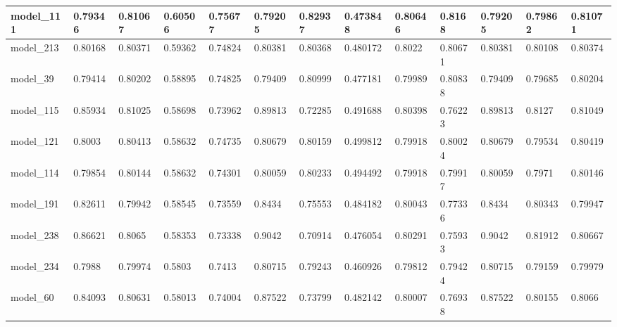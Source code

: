 \begin{tabular}{|l|l|l|l|l|l|l|l|l|l|l|l|l|}
model\_111     & 0.79346     & 0.81067        & 0.60506      & 0.75677          & 0.79205              & 0.82937              & 0.473848     & 0.80646           & 0.8168             & 0.79205         & 0.79862     & 0.81071      \\ \hline
model\_213     & 0.80168     & 0.80371        & 0.59362      & 0.74824          & 0.80381              & 0.80368              & 0.480172     & 0.8022            & 0.80671            & 0.80381         & 0.80108     & 0.80374      \\ \hline
model\_39      & 0.79414     & 0.80202        & 0.58895      & 0.74825          & 0.79409              & 0.80999              & 0.477181     & 0.79989           & 0.80838            & 0.79409         & 0.79685     & 0.80204      \\ \hline
model\_115     & 0.85934     & 0.81025        & 0.58698      & 0.73962          & 0.89813              & 0.72285              & 0.491688     & 0.80398           & 0.76223            & 0.89813         & 0.8127      & 0.81049      \\ \hline
model\_121     & 0.8003      & 0.80413        & 0.58632      & 0.74735          & 0.80679              & 0.80159              & 0.499812     & 0.79918           & 0.80024            & 0.80679         & 0.79534     & 0.80419      \\ \hline
model\_114     & 0.79854     & 0.80144        & 0.58632      & 0.74301          & 0.80059              & 0.80233              & 0.494492     & 0.79918           & 0.79917            & 0.80059         & 0.7971      & 0.80146      \\ \hline
model\_191     & 0.82611     & 0.79942        & 0.58545      & 0.73559          & 0.8434               & 0.75553              & 0.484182     & 0.80043           & 0.77336            & 0.8434          & 0.80343     & 0.79947      \\ \hline
model\_238     & 0.86621     & 0.8065         & 0.58353      & 0.73338          & 0.9042               & 0.70914              & 0.476054     & 0.80291           & 0.75933            & 0.9042          & 0.81912     & 0.80667      \\ \hline
model\_234     & 0.7988      & 0.79974        & 0.5803       & 0.7413           & 0.80715              & 0.79243              & 0.460926     & 0.79812           & 0.79424            & 0.80715         & 0.79159     & 0.79979      \\ \hline
model\_60      & 0.84093     & 0.80631        & 0.58013      & 0.74004          & 0.87522              & 0.73799              & 0.482142     & 0.80007           & 0.76938            & 0.87522         & 0.80155     & 0.8066       \\ \hline

\end{tabular}
